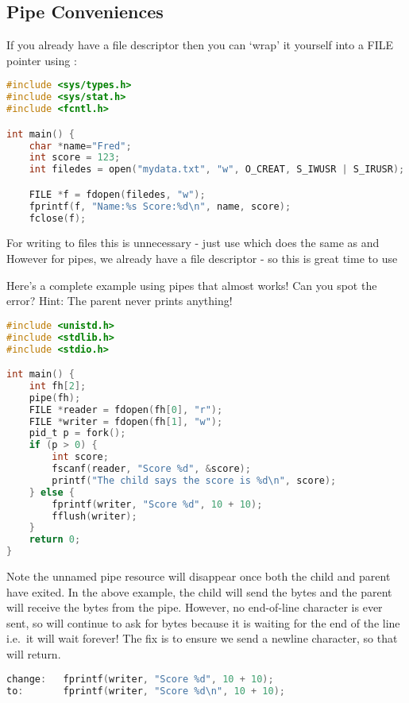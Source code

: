\subsection{Pipe Conveniences}

If you already have a file descriptor then you can `wrap' it yourself into a FILE pointer using  :

\begin{lstlisting}[language=C]
#include <sys/types.h>
#include <sys/stat.h>
#include <fcntl.h>

int main() {
    char *name="Fred";
    int score = 123;
    int filedes = open("mydata.txt", "w", O_CREAT, S_IWUSR | S_IRUSR);

    FILE *f = fdopen(filedes, "w");
    fprintf(f, "Name:%s Score:%d\n", name, score);
    fclose(f);
\end{lstlisting}

For writing to files this is unnecessary - just use  which does the same as  and  However for pipes, we already have a file descriptor - so this is great time to use 

Here's a complete example using pipes that almost works! Can you spot the error? Hint: The parent never prints anything!

\begin{lstlisting}[language=C]
#include <unistd.h>
#include <stdlib.h>
#include <stdio.h>

int main() {
    int fh[2];
    pipe(fh);
    FILE *reader = fdopen(fh[0], "r");
    FILE *writer = fdopen(fh[1], "w");
    pid_t p = fork();
    if (p > 0) {
        int score;
        fscanf(reader, "Score %d", &score);
        printf("The child says the score is %d\n", score);
    } else {
        fprintf(writer, "Score %d", 10 + 10);
        fflush(writer);
    }
    return 0;
}
\end{lstlisting}

Note the unnamed pipe resource will disappear once both the child and parent have exited.
In the above example, the child will send the bytes and the parent will receive the bytes from the pipe.
However, no end-of-line character is ever sent, so  will continue to ask for bytes because it is waiting for the end of the line i.e.~it will wait forever! The fix is to ensure we send a newline character, so that  will return.

\begin{lstlisting}[language=C]
change:   fprintf(writer, "Score %d", 10 + 10);
to:       fprintf(writer, "Score %d\n", 10 + 10);
\end{lstlisting}

